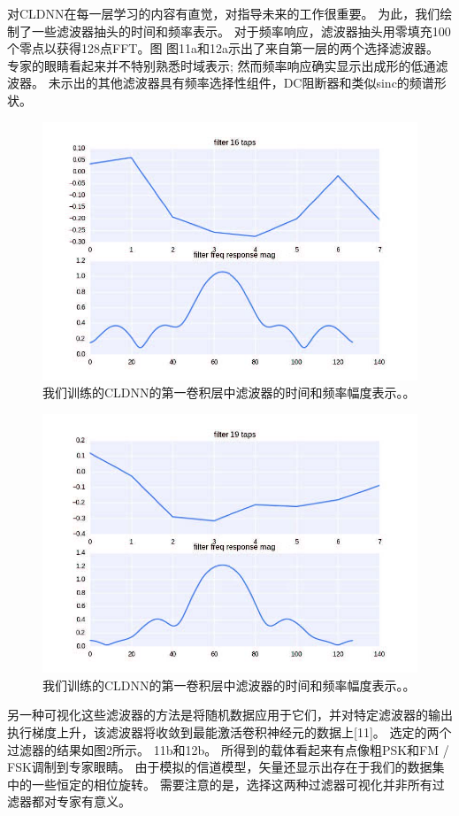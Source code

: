 对CLDNN在每一层学习的内容有直觉，对指导未来的工作很重要。 为此，我们绘制了一些滤波器抽头的时间和频率表示。 对于频率响应，滤波器抽头用零填充100个零点以获得128点FFT。图 图11a和12a示出了来自第一层的两个选择滤波器。 专家的眼睛看起来并不特别熟悉时域表示; 然而频率响应确实显示出成形的低通滤波器。 未示出的其他滤波器具有频率选择性组件，DC阻断器和类似sinc的频谱形状。\par
\begin{figure}[!h]
	\centering
	\includegraphics[scale=1]{figures/chapter_5/fig9_a}
	\caption{我们训练的CLDNN的第一卷积层中滤波器的时间和频率幅度表示。。}
\end{figure}
\begin{figure}[!h]
	\centering
	\includegraphics[scale=1]{figures/chapter_5/fig10_a}
	\caption{我们训练的CLDNN的第一卷积层中滤波器的时间和频率幅度表示。。}
\end{figure}
另一种可视化这些滤波器的方法是将随机数据应用于它们，并对特定滤波器的输出执行梯度上升，该滤波器将收敛到最能激活卷积神经元的数据上[11]。 选定的两个过滤器的结果如图2所示。 11b和12b。 所得到的载体看起来有点像粗PSK和FM / FSK调制到专家眼睛。 由于模拟的信道模型，矢量还显示出存在于我们的数据集中的一些恒定的相位旋转。 需要注意的是，选择这两种过滤器可视化并非所有过滤器都对专家有意义。\par


